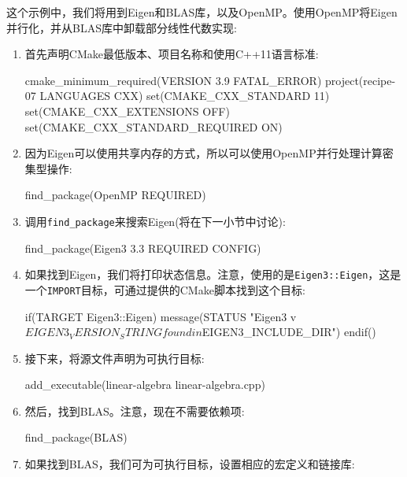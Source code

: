 
这个示例中，我们将用到Eigen和BLAS库，以及OpenMP。使用OpenMP将Eigen并行化，并从BLAS库中卸载部分线性代数实现:

\begin{enumerate}
\item 首先声明CMake最低版本、项目名称和使用C++11语言标准:

\begin{codebox}[cmake]
cmake_minimum_required(VERSION 3.9 FATAL_ERROR)
project(recipe-07 LANGUAGES CXX)
set(CMAKE_CXX_STANDARD 11)
set(CMAKE_CXX_EXTENSIONS OFF)
set(CMAKE_CXX_STANDARD_REQUIRED ON)
\end{codebox}

\item 因为Eigen可以使用共享内存的方式，所以可以使用OpenMP并行处理计算密集型操作:

\begin{codebox}[cmake]
find_package(OpenMP REQUIRED)
\end{codebox}

\item 调用\texttt{find\_package}来搜索Eigen(将在下一小节中讨论):

\begin{codebox}[cmake]
find_package(Eigen3 3.3 REQUIRED CONFIG)
\end{codebox}

\item 如果找到Eigen，我们将打印状态信息。注意，使用的是\texttt{Eigen3::Eigen}，这是一个\texttt{IMPORT}目标，可通过提供的CMake脚本找到这个目标:

\begin{codebox}[cmake]
if(TARGET Eigen3::Eigen)
  message(STATUS "Eigen3 v${EIGEN3_VERSION_STRING} found in ${EIGEN3_INCLUDE_DIR}")
endif()
\end{codebox}

\item 接下来，将源文件声明为可执行目标:

\begin{codebox}[cmake]
add_executable(linear-algebra linear-algebra.cpp)
\end{codebox}

\item 然后，找到BLAS。注意，现在不需要依赖项:

\begin{codebox}[cmake]
find_package(BLAS)
\end{codebox}

\item 如果找到BLAS，我们可为可执行目标，设置相应的宏定义和链接库:


\end{enumerate}
